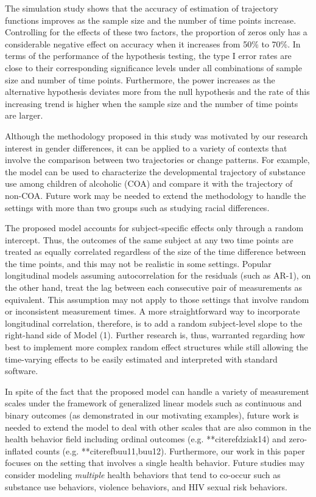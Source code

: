 The simulation study shows that the accuracy of estimation of
trajectory functions improves as the sample size and the number of
time points increase. Controlling for the effects of these two
factors, the proportion of zeros only has a considerable negative
effect on accuracy when it increases from 50\% to 70\%. In terms
of the performance of the hypothesis testing, the type I error
rates are close to their corresponding significance levels under
all combinations of sample size and number of time points.
Furthermore, the power increases as the alternative hypothesis
deviates more from the null hypothesis and the rate of this
increasing trend is higher when the sample size and the number of
time points are larger.

Although the methodology proposed in this study was motivated by
our research interest in gender differences, it can be applied to
a variety of contexts that involve the comparison between two
trajectories or change patterns. For example, the model can be
used to characterize the developmental trajectory of substance use
among children of alcoholic (COA) and compare it with the
trajectory of non-COA. Future work may be needed to extend the
methodology to handle the settings with more than two groups such
as studying racial differences.

The proposed model accounts for subject-specific effects only
through a random intercept. Thus, the outcomes of the same subject
at any two time points are treated as equally correlated
regardless of the size of the time difference between the time
points, and this may not be realistic in some settings. Popular
longitudinal models assuming autocorrelation for the residuals
(such as AR-1), on the other hand, treat the lag between each
consecutive pair of measurements as equivalent. This assumption
may not apply to those settings that involve random or
inconsistent measurement times. A more straightforward way to
incorporate longitudinal correlation, therefore, is to add a
random subject-level slope to the right-hand side of Model (1).
Further research is, thus, warranted regarding how best to
implement more complex random effect structures while still
allowing the time-varying effects to be easily estimated and
interpreted with standard software.


In spite of the fact that the proposed model can handle a variety
of measurement scales under the framework of generalized linear
models such as continuous and binary outcomes (as demonstrated in
our motivating examples), future work is needed to extend the
model to deal with other scales that are also common in the health
behavior field including ordinal outcomes (e.g. **citeref{dziak14})
and zero-inflated counts (e.g. **citeref{buu11,buu12}). Furthermore,
our work in this paper focuses on the setting that involves a
single health behavior. Future studies may consider modeling
\emph{multiple} health behaviors that tend to co-occur such as
substance use behaviors, violence behaviors, and HIV sexual risk
behaviors.

